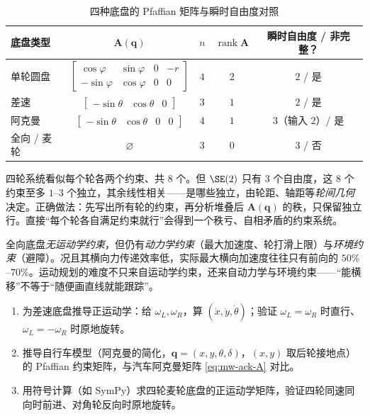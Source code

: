 \begin{table}[H]\centering\small
\caption{四种底盘的 Pfaffian 矩阵与瞬时自由度对照}
\label{tab:mw-chassis}
\begin{tabular}{lccc c}
\toprule
底盘类型 & $\mathbf{A}(\mathbf{q})$ & $n$ & $\operatorname{rank}\mathbf{A}$ & 瞬时自由度 / 非完整？ \\
\midrule
单轮圆盘 & $\left[\begin{smallmatrix}\cos\varphi&\sin\varphi&0&-r\\-\sin\varphi&\cos\varphi&0&0\end{smallmatrix}\right]$ & $4$ & $2$ & $2$ / 是 \\[2pt]
差速 & $\left[\begin{smallmatrix}-\sin\theta&\cos\theta&0\end{smallmatrix}\right]$ & $3$ & $1$ & $2$ / 是 \\[2pt]
阿克曼 & $\left[\begin{smallmatrix}-\sin\theta&\cos\theta&0&0\end{smallmatrix}\right]$ & $4$ & $1$ & $3$（输入 $2$）/ 是 \\[2pt]
全向 / 麦轮 & $\varnothing$ & $3$ & $0$ & $3$ / 否 \\
\bottomrule
\end{tabular}
\end{table}

\begin{pitfall}
四轮系统看似每个轮各两个约束、共 $8$ 个。但 $\SE(2)$ 只有 $3$ 个自由度，这 $8$ 个约束至多 $1$–$3$ 个独立，其余线性相关——是哪些独立，由轮距、轴距等\emph{轮间几何}决定。正确做法：先写出所有轮的约束，再分析堆叠后 $\mathbf{A}(\mathbf{q})$ 的秩，只保留独立行。直接“每个轮各自满足约束就行”会得到一个秩亏、自相矛盾的约束系统。
\end{pitfall}

\begin{pitfall}
全向底盘\emph{无运动学约束}，但仍有\emph{动力学约束}（最大加速度、轮打滑上限）与\emph{环境约束}（避障）。况且其横向力传递效率低，实际最大横向加速度往往只有前向的 $50\%$–$70\%$。运动规划的难度不只来自运动学约束，还来自动力学与环境约束——“能横移”不等于“随便画直线就能跟踪”。
\end{pitfall}

\begin{practice}
\begin{enumerate}
  \item 为差速底盘推导正运动学：给 $\omega_L,\omega_R$，算 $(\dot x,\dot y,\dot\theta)$；验证 $\omega_L=\omega_R$ 时直行、$\omega_L=-\omega_R$ 时原地旋转。
  \item 推导自行车模型（阿克曼的简化，$\mathbf{q}=(x,y,\theta,\delta)$，$(x,y)$ 取后轮接地点）的 Pfaffian 约束矩阵，与汽车阿克曼矩阵 \cref{eq:mw-ack-A} 对比。
  \item 用符号计算（如 SymPy）求四轮麦轮底盘的正运动学矩阵，验证四轮同速同向时前进、对角轮反向时原地旋转。
\end{enumerate}
\end{practice}

